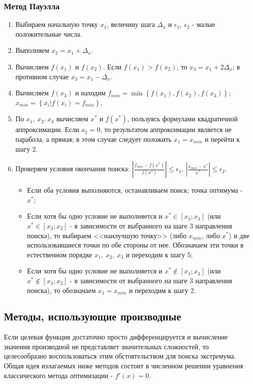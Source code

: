 \documentclass[a4paper,12pt]{report}
\begin{document}
\subsubsection{Метод Пауэлла}
\begin{enumerate}
\item Выбираем начальную точку $x_{1}$, величину шага $\Delta_{x}$ и $\epsilon_{1},\ \epsilon_{2}$ - малые положительные числа.
\item Выполняем $x_{2} = x_{1} + \Delta_{x}$.
\item Вычисляем $f(x_{1})$ и $f(x_{2})$. Если $f(x_{1}) > f(x_{2})$, то $x_{3} = x_{1} + 2\Delta_{x}$; в противном случае $x_{3} = x_{1} - \Delta_{x}$.
\item Вычисляем $f(x_{3})$ и находим $f_{min} = \min\left\{f(x_{1}),f(x_{2}),f(x_{3})\right\}$; $x_{min} = \left\{x_{i} | f(x_{i}) = f_{min}\right\}$.
\item По $x_{1},\ x_{2}.\ x_{3}$ вычисляем $x^{*}$ и $f(x^{*})$, пользуясь формулами квадратичной аппроксимации. Если $a_{2}=0$, то результатом аппроксимации является не парабола, а прямая; в этом случае следует положить $x_{1}=x_{min}$ и перейти к шагу 2.
\item Проверяем условия окончания поиска: $\left|\frac{f_{min} - f(x^{*})}{f(x^{*})}\right| \leq \epsilon_{1}$, $\left|\frac{x_{min} - x^{*}}{x^{*}}\right| \leq \epsilon_{2}$.
\begin{itemize}
\item Если оба условия выполняются, останавливаем поиск; точка оптимума - $x^{*}$;
\item Если хотя бы одно условие не выполняется и $x^{*} \in [x_{1}; x_{3}]$ (или $x^{*} \in [x_{3}; x_{2}]$ - в зависимости от выбранного на шаге 3 направления поиска), то выбираем <<наилучшую точку>> (либо $x_{min}$, либо $x^{*}$) и две использовавшиеся точки по обе стороны от нее. Обозначаем эти точки в естественном порядке $x_{1},\ x_{2},\ x_{3}$ и переходим к шагу 5;
\item Если хотя бы одно условие не выполняется и $x^{*} \notin [x_{1}; x_{3}]$ (или $x^{*} \notin [x_{3}; x_{2}]$ - в зависимости от выбранного на шаге 3 направления поиска), то обозначаем $x_{1}=x_{min}$ и переходим к шагу 2.
\end{itemize}
\end{enumerate}

\subsection{Методы, использующие производные}
Если целевая функция достаточно просто дифференцируется и вычисление значения производной не представляет значительных сложностей, то целесообразно воспользоваться этим обстоятельством для поиска экстремума. Общая идея излагаемых ниже методов состоит в численном решении уравнения классического метода оптимизации - $f'(x) = 0$.
\end{document}
